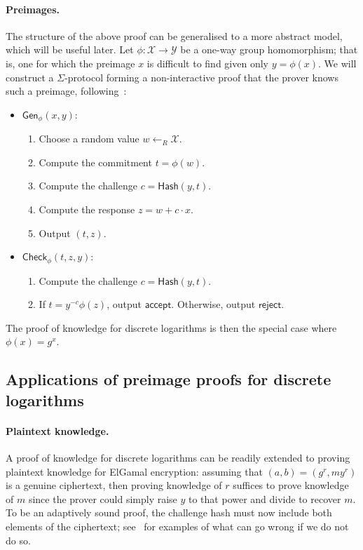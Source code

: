 \documentclass[12pt,a4paper]{article}
\theoremstyle{definition}
\begin{document}
\paragraph{Preimages.}\label{sec-preimage}
The structure of the above proof can be generalised to a more abstract model, which will be useful later. Let $\phi:\mathcal{X}\rightarrow \mathcal{Y}$ be a one-way group homomorphism; that is, one for which the preimage $x$ is difficult to find given only $y=\phi(x)$. We will construct a $\Sigma$-protocol forming a non-interactive proof that the prover knows such a preimage, following~\cite{haenni2017pseudo}:
\begin{itemize}
    \item $\mathsf{Gen}_\phi(x, y)$:
    \begin{enumerate}
        \item Choose a random value $w\gets_R \mathcal{X}$.
        \item Compute the commitment $t = \phi(w)$.
        \item Compute the challenge $c = \mathsf{Hash}(y, t)$.
        \item Compute the response $z = w + c\cdot x$.
        \item Output $(t, z)$.
    \end{enumerate}
    \item $\mathsf{Check}_\phi(t, z, y)$:
    \begin{enumerate}
        \item Compute the challenge $c = \mathsf{Hash}(y, t)$.
        \item If $t=y^{-c}\phi(z)$, output $\mathsf{accept}$. Otherwise, output $\mathsf{reject}$.
    \end{enumerate}
\end{itemize}
The proof of knowledge for discrete logarithms is then the special case where $\phi(x) = g^x$.

\subsection{Applications of preimage proofs for discrete logarithms}\label{sec-plaintext-knowledge}
\paragraph{Plaintext knowledge.}
A proof of knowledge for discrete logarithms can be readily extended to proving plaintext knowledge for ElGamal encryption: assuming that $(a, b) = (g^r, my^r)$ is a genuine ciphertext, then proving knowledge of $r$ suffices to prove knowledge of $m$ since the prover could simply raise $y$ to that power and divide to recover $m$. To be an adaptively sound proof, the challenge hash must now include both elements of the ciphertext; see~\cite{mcmurtry2020test} for examples of what can go wrong if we do not do so.
\end{document}
